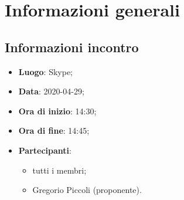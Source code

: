 \section{Informazioni generali}
\subsection{Informazioni incontro}
\begin{itemize}
\item \textbf{Luogo}: Skype;
\item \textbf{Data}: 2020-04-29;
\item \textbf{Ora di inizio}: 14:30;
\item \textbf{Ora di fine}: 14:45;
\item \textbf{Partecipanti}:
	\begin{itemize}
		\item tutti i membri;
		\item Gregorio Piccoli (proponente).
	\end{itemize}
\end{itemize}

